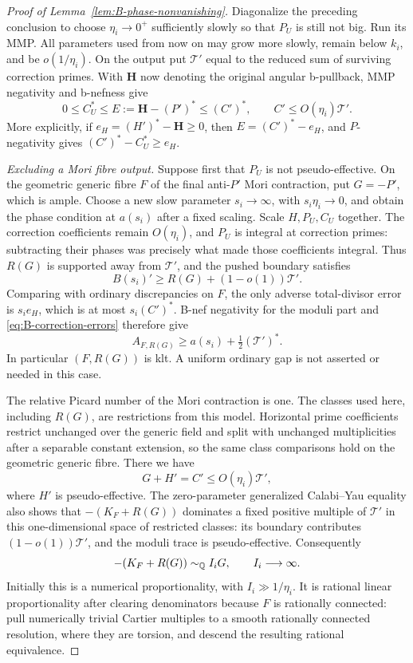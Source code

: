 \begin{proof}[Proof of Lemma~\ref{lem:B-phase-nonvanishing}]
Diagonalize the preceding conclusion to choose
$\eta_i\to0^+$ sufficiently slowly so that $P_U$ is still
not big.  Run its MMP.  All parameters used from now on may
grow more slowly, remain below $k_i$, and be $o(1/\eta_i)$.
On the output put
$\mathcal T'$ equal to the reduced sum of surviving correction
primes.  With $\mathbf H$ now denoting the original angular
b-pullback, MMP negativity and b-nefness give
\begin{equation}\label{eq:B-correction-errors}
 0\le C_U^*\le
 E:=\mathbf H-(P')^*
 \le(C')^*,
 \qquad C'\le O(\eta_i)\mathcal T'.
\end{equation}
More explicitly, if $e_H=(H')^*-\mathbf H\ge0$, then
$E=(C')^*-e_H$, and $P$-negativity gives
$(C')^*-C_U^*\ge e_H$.

\medskip
\noindent\emph{Excluding a Mori fibre output.}
Suppose first that $P_U$ is not pseudo-effective.  On the
geometric generic fibre $F$ of the final anti-$P'$ Mori
contraction, put $G=-P'$, which is ample.  Choose a new slow
parameter $s_i\to\infty$, with $s_i\eta_i\to0$, and obtain
the phase condition at $a(s_i)$ after a fixed scaling.
Scale $H,P_U,C_U$ together.  The correction coefficients
remain $O(\eta_i)$, and $P_U$ is integral at correction
primes: subtracting their phases was precisely what made
those coefficients integral.  Thus $R(G)$ is supported
away from $\mathcal T'$, and the pushed boundary satisfies
\[
 B(s_i)'\ge R(G)+(1-o(1))\mathcal T'.
\]
Comparing with ordinary discrepancies on $F$, the only
adverse total-divisor error is $s_ie_H$, which is at most
$s_i(C')^*$.  B-nef negativity for the moduli part and
\eqref{eq:B-correction-errors} therefore give
\begin{equation}\label{eq:B-negative-discrepancy}
 A_{F,R(G)}
 \ge a(s_i)+\tfrac12(\mathcal T')^*.
\end{equation}
In particular $(F,R(G))$ is klt.  A uniform ordinary gap is
not asserted or needed in this case.

The relative Picard number of the Mori contraction is one.
The classes used here, including $R(G)$, are restrictions
from this model.  Horizontal prime coefficients restrict
unchanged over the generic field and split with unchanged
multiplicities after a separable constant extension, so the
same class comparisons hold on the geometric generic fibre.
There we have
\[
 G+H'=C'\le O(\eta_i)\mathcal T',
\]
where $H'$ is pseudo-effective.  The zero-parameter
generalized Calabi--Yau equality also shows that
$-(K_F+R(G))$ dominates a fixed positive multiple of
$\mathcal T'$ in this one-dimensional space of restricted
classes: its boundary contributes $(1-o(1))\mathcal T'$,
and the moduli trace is pseudo-effective.  Consequently
\begin{equation}\label{eq:B-large-index}
 -(K_F+R(G))\sim_{\mathbb Q}I_iG,
 \qquad I_i\longrightarrow\infty.
\end{equation}
Initially this is a numerical proportionality, with
$I_i\gg1/\eta_i$.  It is rational linear proportionality
after clearing denominators because $F$ is rationally
connected: pull numerically trivial Cartier multiples to a
smooth rationally connected resolution, where they are
torsion, and descend the resulting rational equivalence.


\end{proof}
